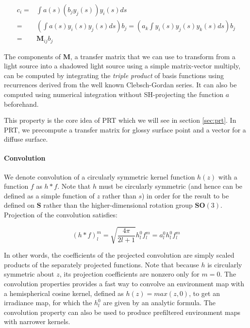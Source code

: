 \begin{equation*}
\begin{aligned}
	c_i=&\int a(s)(b_jy_j(s))y_i(s)ds\\
	   =&(\int a(s)y_i(s)y_j(s)ds)b_j=(a_k\int y_i(s)y_j(s)y_k(s)ds)b_j\\
	   =&\mathbf{M}_{ij}b_j
\end{aligned}
\end{equation*}

The components of $\mathbf{M}$, a transfer matrix that we can use to transform from a light source into a shadowed light source using a simple matrix-vector multiply, can be computed by integrating the \textit{triple product} of basis functions using recurrences derived from the well known Clebsch-Gordan series. It can also be computed using numerical integration without SH-projecting the function $a$ beforehand.

This property is the core idea of PRT which we will see in section \ref{sec:prt}. In PRT, we precompute a transfer matrix for glossy surface point and a vector for a diffuse surface.  



\paragraph{Convolution}
We denote convolution of a circularly symmetric kernel function $h(z)$ with a function $f$ as $h*f$. Note that $h$ must be circularly symmetric (and hence can be defined as a simple function of $z$ rather than $s$) in order for the result to be defined on $\mathbf{S}$ rather than the higher-dimensional rotation group $\mathbf{SO}(3)$. Projection of the convolution satisfies:

\begin{equation*}
	(h*f)^{m}_{l}=\sqrt{\frac{4\pi}{2l+1}}h^{0}_{l}f^{m}_{l}=a^{0}_{l}h^{0}_{l}f^{m}_{l}
\end{equation*} 

In other words, the coefficients of the projected convolution are simply scaled products of the separately projected functions. Note that because $h$ is circularly symmetric about $z$, its projection coefficients are nonzero only for $m=0$. The convolution properties provides a fast way to convolve an environment map with a hemispherical cosine kernel, defined as $h(z) = max(z,0)$, to get an irradiance map, for which the $h_l^{0}$ are given by an analytic formula. The convolution property can also be used to produce prefiltered environment maps with narrower kernels.





